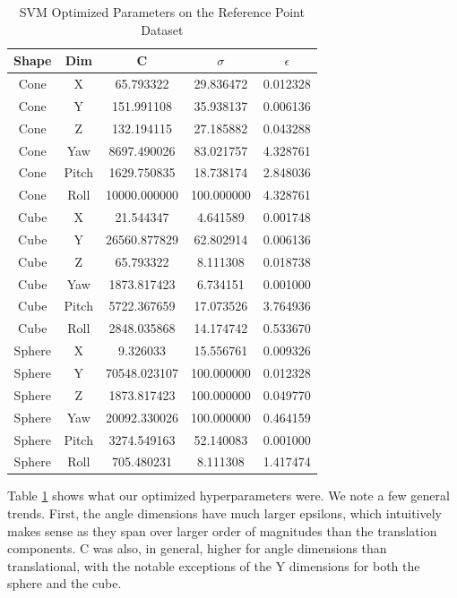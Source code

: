 \documentclass[journal]{IEEEtran}
\begin{document}
\begin{table}[h]
\caption{SVM Optimized Parameters on the Reference Point Dataset}
\label{SVM_Point_Parms}
\centering

\begin{tabular}{|c|c|c|c|c|}
\hline
Shape & Dim & C & $\sigma$ & $\epsilon$\\
\hline
Cone & X & 65.793322 & 29.836472 & 0.012328\\
Cone & Y & 151.991108 & 35.938137 & 0.006136\\
Cone & Z & 132.194115 & 27.185882 & 0.043288\\
Cone & Yaw & 8697.490026 & 83.021757 & 4.328761\\
Cone & Pitch & 1629.750835 & 18.738174 & 2.848036\\
Cone & Roll & 10000.000000 & 100.000000 & 4.328761\\
\hline
Cube & X & 21.544347 & 4.641589 & 0.001748\\
Cube & Y & 26560.877829 & 62.802914 & 0.006136\\
Cube & Z & 65.793322 & 8.111308 & 0.018738\\
Cube & Yaw & 1873.817423 & 6.734151 & 0.001000\\
Cube & Pitch & 5722.367659 & 17.073526 & 3.764936\\
Cube & Roll & 2848.035868 & 14.174742 & 0.533670\\
\hline
Sphere &  X & 9.326033 & 15.556761 & 0.009326\\
Sphere &  Y & 70548.023107 & 100.000000 & 0.012328\\
Sphere &  Z & 1873.817423 & 100.000000 & 0.049770\\
Sphere &  Yaw & 20092.330026 & 100.000000 & 0.464159\\
Sphere &  Pitch & 3274.549163 & 52.140083 & 0.001000\\
Sphere &  Roll & 705.480231 & 8.111308 & 1.417474\\
\hline
\end{tabular}
\end{table}

Table \ref{SVM_Point_Parms} shows what our optimized hyperparameters were. We note a few general trends. First, the angle dimensions have much larger epsilons, which intuitively makes sense as they span over larger order of magnitudes than the translation components. C was also, in general, higher for angle dimensions than translational, with the notable exceptions of the Y dimensions for both the sphere and the cube.
\end{document}
